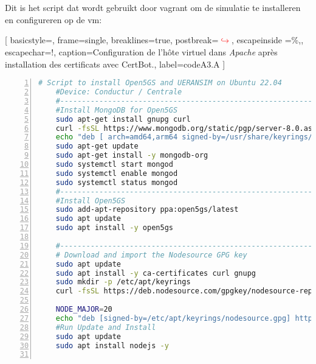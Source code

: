 \section{}
\label{sec:script}

Dit is het script dat wordt gebruikt door vagrant om de simulatie te installeren en configureren op de \gls{vm}:

[
    basicstyle=\small,
    frame=single,   
        breaklines=true,
        postbreak=\mbox{\textcolor{red}{$\hookrightarrow$}\space},
        escapeinside ={\%,},
    escapechar={!},
    caption={Configuration de l'hôte virtuel dans \emph{Apache} après installation des certificats avec CertBot.},
    label={codeA3.A}
    ]

\begin{lstlisting}[basicstyle=\small, frame=single, breaklines=true, postbreak=\mbox{\textcolor{red}{$\hookrightarrow$}\space}, escapeinside ={\%,}, escapechar={!}, numbers=left, language=sh, caption=Script]
    # Script to install Open5GS and UERANSIM on Ubuntu 22.04
    #Device: Conductur / Centrale
    #-----------------------------------------------------------
    #Install MongoDB for Open5GS
    sudo apt-get install gnupg curl
    curl -fsSL https://www.mongodb.org/static/pgp/server-8.0.asc | sudo gpg -o /usr/share/keyrings/mongodb-server-8.0.gpg --dearmor
    echo "deb [ arch=amd64,arm64 signed-by=/usr/share/keyrings/mongodb-server-8.0.gpg ] https://repo.mongodb.org/apt/ubuntu noble/mongodb-org/8.0 multiverse" | sudo tee /etc/apt/sources.list.d/mongodb-org-8.0.list
    sudo apt-get update
    sudo apt-get install -y mongodb-org
    sudo systemctl start mongod
    sudo systemctl enable mongod
    sudo systemctl status mongod
    #-----------------------------------------------------------
    #Install Open5GS
    sudo add-apt-repository ppa:open5gs/latest
    sudo apt update
    sudo apt install -y open5gs

    #-----------------------------------------------------------
    # Download and import the Nodesource GPG key
    sudo apt update
    sudo apt install -y ca-certificates curl gnupg
    sudo mkdir -p /etc/apt/keyrings
    curl -fsSL https://deb.nodesource.com/gpgkey/nodesource-repo.gpg.key | sudo gpg --dearmor -o /etc/apt/keyrings/nodesource.gpg

    NODE_MAJOR=20
    echo "deb [signed-by=/etc/apt/keyrings/nodesource.gpg] https://deb.nodesource.com/node_$NODE_MAJOR.x nodistro main" | sudo tee /etc/apt/sources.list.d/nodesource.list
    #Run Update and Install
    sudo apt update
    sudo apt install nodejs -y


\end{lstlisting}
